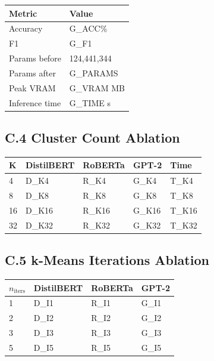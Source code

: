 \begin{table}[H]
\centering
\small
\begin{tabular}{ll}
\toprule
\textbf{Metric} & \textbf{Value} \\
\midrule
Accuracy & {{G\_ACC}}\% \\
F1 & {{G\_F1}} \\
Params before & 124,441,344 \\
Params after & {{G\_PARAMS}} \\
Peak VRAM & {{G\_VRAM}} MB \\
Inference time & {{G\_TIME}} s \\
\bottomrule
\end{tabular}
\end{table}

\subsection{C.4 Cluster Count Ablation}

\begin{table}[H]
\centering
\small
\begin{tabular}{lllll}
\toprule
\textbf{K} & \textbf{DistilBERT} & \textbf{RoBERTa} & \textbf{GPT-2} & \textbf{Time} \\
\midrule
4 & {{D\_K4}} & {{R\_K4}} & {{G\_K4}} & {{T\_K4}} \\
8 & {{D\_K8}} & {{R\_K8}} & {{G\_K8}} & {{T\_K8}} \\
16 & {{D\_K16}} & {{R\_K16}} & {{G\_K16}} & {{T\_K16}} \\
32 & {{D\_K32}} & {{R\_K32}} & {{G\_K32}} & {{T\_K32}} \\
\bottomrule
\end{tabular}
\end{table}

\subsection{C.5 k-Means Iterations Ablation}

\begin{table}[H]
\centering
\small
\begin{tabular}{llll}
\toprule
\textbf{$n_{\text{iters}}$} & \textbf{DistilBERT} & \textbf{RoBERTa} & \textbf{GPT-2} \\
\midrule
1 & {{D\_I1}} & {{R\_I1}} & {{G\_I1}} \\
2 & {{D\_I2}} & {{R\_I2}} & {{G\_I2}} \\
3 & {{D\_I3}} & {{R\_I3}} & {{G\_I3}} \\
5 & {{D\_I5}} & {{R\_I5}} & {{G\_I5}} \\
\bottomrule
\end{tabular}
\end{table}

